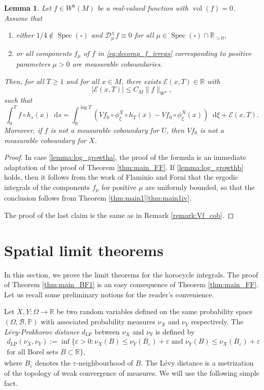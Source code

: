 \documentclass[11pt]{article}
\newenvironment{enumeratea}
{\bgroup\def\theenumi{\alph{enumi}}\begin{enumerate}}
{\end{enumerate}\egroup}
\newcommand \R{\mathbb{R}}
\newcommand*{\diff}{\mathop{}\!\mathrm{d}}
\newcommand{\Dpm}[1]{\mathcal{D}_\mu^{\pm} #1}
\newcommand{\Levy}{d_{\levyy}}
\DeclareMathOperator{\vol}{vol}
\DeclareMathOperator{\Spec}{Spec}
\DeclareMathOperator{\levyy}{LP}
\newtheorem {lemma}[theorem]{Lemma}
\theoremstyle{definition}
\begin{document}
\begin{lemma}\label{lemma:log_growth}
Let $f \in W^6(M)$ be a real-valued function with $\vol(f)=0$.
Assume that
\begin{enumeratea}
\item\label{lemma:log_growtha}
either $1/4 \notin \Spec(\square)$ and $\Dpm{f} \equiv 0$ for all $\mu \in \Spec(\square) \cap \R_{>0}$,
\item\label{lemma:log_growthb}
or all components $f_\mu$ of $f$ in \eqref{eq:decomp_f_irreps} corresponding to positive parameters $\mu >0$ are measurable coboundaries.
\end{enumeratea}
Then, for all $T \geq 1$ and for all $x \in M$, there exists $\mathcal{E}(x,T) \in \R$ with
\[
|\mathcal{E}(x,T) |\leq C_M \|f\|_{W^4},
\]
such that
\[
\int_0^T f \circ h_s(x) \diff s = \int_0^{\log T} \left(Vf_0 \circ \phi^X_{\xi}\circ h_T(x) - Vf_0\circ \phi^X_{\xi}(x) \right) \diff \xi + \mathcal{E}(x,T).
\]
Moreover, if $f$ is not a measurable coboundary for $U$, then $Vf_0$ is not a measurable coboundary for $X$.
\end{lemma}

\begin{proof}
In case \eqref{lemma:log_growtha}, the proof of the formula is an immediate adaptation of the proof of Theorem \ref{thm:main_FF}. If \eqref{lemma:log_growthb} holds, then it follows from the work of Flaminio and Forni that the ergodic integrals of the components $f_\mu$ for positive $\mu$ are uniformly bounded, so that the conclusion follows from Theorem \ref{thm:main1}\eqref{thm:main1iv}.

The proof of the last claim is the same as in Remark \ref{remark:Vf_cob}.
\end{proof}

\section{Spatial limit theorems}\label{sec:limit}

In this section, we prove the limit theorems for the horocycle integrals. The proof of Theorem \ref{thm:main_BF1} is an easy consequence of Theorem \ref{thm:main_FF}. Let us recall some preliminary notions for the reader's convenience.

Let $X,Y \colon \Omega \to \R$ be two random variables defined on the same probability space $(\Omega, \mathcal{B}, \mathbb{P})$ with associated probability measures $\nu_X$ and $\nu_Y$ respectively.
The \emph{Lévy-Prokhorov distance} $\Levy$ between $\nu_X$ and $\nu_Y$ is defined by
\begin{multline*}
\Levy(\nu_X, \nu_Y) := \inf \{\varepsilon > 0 : \nu_X(B) \leq \nu_Y(B_{\varepsilon}) + \varepsilon \text{\ and\ } \nu_Y(B) \leq \nu_X(B_{\varepsilon}) + \varepsilon \\
\text{for all Borel sets\ } B \subset \R\},
\end{multline*}
where $B_{\varepsilon}$ denotes the $\varepsilon$-neighbourhood of $B$.
The Lévy distance is a metrization of the topology of weak convergence of measures.
We will use the following simple fact.
\end{document}
